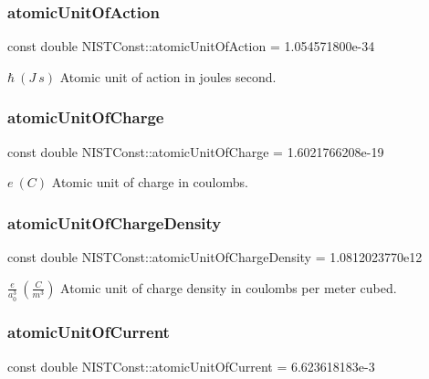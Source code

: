 \subsubsection{\texorpdfstring{atomic\+Unit\+Of\+Action}{atomicUnitOfAction}}
{\footnotesize\ttfamily const double N\+I\+S\+T\+Const\+::atomic\+Unit\+Of\+Action = 1.\+054571800e-\/34}

$\hbar \ (J\ s)$ Atomic unit of action in joules second. \mbox{\label{group___n_i_s_t_const-_atomic_unit_ga1a42bd5db581dc5bf7a87b864bc77cf4}} 
\subsubsection{\texorpdfstring{atomic\+Unit\+Of\+Charge}{atomicUnitOfCharge}}
{\footnotesize\ttfamily const double N\+I\+S\+T\+Const\+::atomic\+Unit\+Of\+Charge = 1.\+6021766208e-\/19}

$e \ (C)$ Atomic unit of charge in coulombs. \mbox{\label{group___n_i_s_t_const-_atomic_unit_gaa1918065ee8731837afe6bddee194320}} 
\subsubsection{\texorpdfstring{atomic\+Unit\+Of\+Charge\+Density}{atomicUnitOfChargeDensity}}
{\footnotesize\ttfamily const double N\+I\+S\+T\+Const\+::atomic\+Unit\+Of\+Charge\+Density = 1.\+0812023770e12}

$\frac{e}{a_0^3} \ (\frac{C}{m^3})$ Atomic unit of charge density in coulombs per meter cubed. \mbox{\label{group___n_i_s_t_const-_atomic_unit_ga6d0f3cfc8aaa2aeb120559aaea2dc5c6}} 
\subsubsection{\texorpdfstring{atomic\+Unit\+Of\+Current}{atomicUnitOfCurrent}}
{\footnotesize\ttfamily const double N\+I\+S\+T\+Const\+::atomic\+Unit\+Of\+Current = 6.\+623618183e-\/3}

